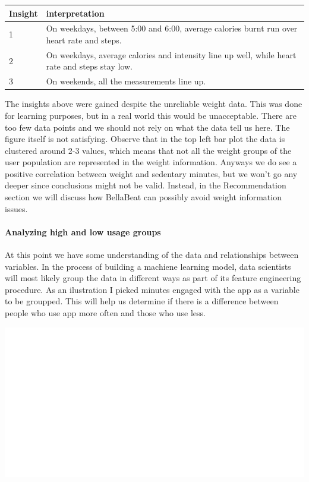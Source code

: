 \documentclass[
]{article}
\begin{document}
\begin{table}
\centering\begingroup\fontsize{14}{16}\selectfont

\begin{tabular}[t]{l|l}
\hline
Insight & interpretation\\
\hline
1 & On weekdays, between 5:00 and 6:00, average calories burnt run over heart rate and steps.\\
\hline
2 & On weekdays, average calories and intensity line up well, while heart rate and steps stay low.\\
\hline
3 & On weekends, all the measurements line up.\\
\hline
\end{tabular}
\endgroup{}
\end{table}

The insights above were gained despite the unreliable weight data. This
was done for learning purposes, but in a real world this would be
unacceptable. There are too few data points and we should not rely on
what the data tell us here. The figure itself is not satisfying. Observe
that in the top left bar plot the data is clustered around 2-3 values,
which means that not all the weight groups of the user population are
represented in the weight information. Anyways we do see a positive
correlation between weight and sedentary minutes, but we won't go any
deeper since conclusions might not be valid. Instead, in the
Recommendation section we will discuss how BellaBeat can possibly avoid
weight information issues.

\hypertarget{analyzing-high-and-low-usage-groups}{%
\paragraph{Analyzing high and low usage
groups}\label{analyzing-high-and-low-usage-groups}}

At this point we have some understanding of the data and relationships
between variables. In the process of building a machiene learning model,
data scientists will most likely group the data in different ways as
part of its feature engineering procedure. As an ilustration I picked
minutes engaged with the app as a variable to be groupped. This will
help us determine if there is a difference between people who use app
more often and those who use less.

\includegraphics[width=0.5\linewidth]{./figs/histogram1}
\end{document}
